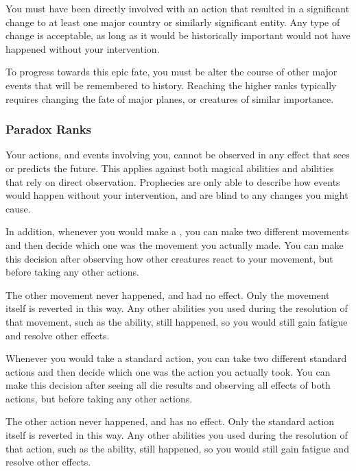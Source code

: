      You must have been directly involved with an action that resulted in a significant change to at least one major country or similarly significant entity.
    Any type of change is acceptable, as long as it would be historically important would not have happened without your intervention.

     To progress towards this epic fate, you must be alter the course of other major events that will be remembered to history.
    Reaching the higher ranks typically requires changing the fate of major planes, or creatures of similar importance.

    \subsubsection{Paradox Ranks}
       Your actions, and events involving you, cannot be observed in any effect that sees or predicts the future.
      This applies against both magical abilities and abilities that rely on direct observation.
      Prophecies are only able to describe how events would happen without your intervention, and are blind to any changes you might cause.

      In addition, whenever you would make a , you can make two different movements and then decide which one was the movement you actually made.
      You can make this decision after observing how other creatures react to your movement, but before taking any other actions.

      The other movement never happened, and had no effect.
      Only the movement itself is reverted in this way.
      Any other abilities you used during the resolution of that movement, such as the  ability, still happened, so you would still gain fatigue and resolve other effects.

       Whenever you would take a standard action, you can take two different standard actions and then decide which one was the action you actually took.
      You can make this decision after seeing all die results and observing all effects of both actions, but before taking any other actions.

      The other action never happened, and has no effect.
      Only the standard action itself is reverted in this way.
      Any other abilities you used during the resolution of that action, such as the  ability, still happened, so you would still gain fatigue and resolve other effects.


